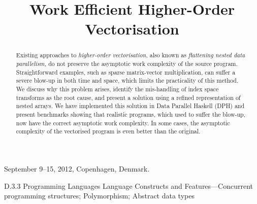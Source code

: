\documentclass{sigplanconf}
\begin{document}
\title	{Work Efficient Higher-Order Vectorisation}


 {September 9--15, 2012, Copenhagen, Denmark.}

\maketitle
\makeatactive

\begin{abstract}
Existing approaches to \emph{higher-order vectorisation}, also known as \emph{flattening nested data parallelism,} do not preserve the asymptotic work complexity of the source program. Straightforward examples, such as sparse matrix-vector multiplication, can suffer a severe blow-up in both time and space, which limits the practicality of this method. We discuss why this problem arises, identify the mis-handling of index space transforms as the root cause, and present a solution using a refined representation of nested arrays. We have implemented this solution in Data Parallel Haskell (DPH) and present benchmarks showing that realistic programs, which used to suffer the blow-up, now have the correct asymptotic work complexity. In some cases, the asymptotic complexity of the vectorised program is even better than the original.
\end{abstract}

\category
	{D.3.3}
	{Programming Languages}
	{Language Constructs and Features---Concurrent programming structures; Polymorphism; Abstract data types}
\end{document}

